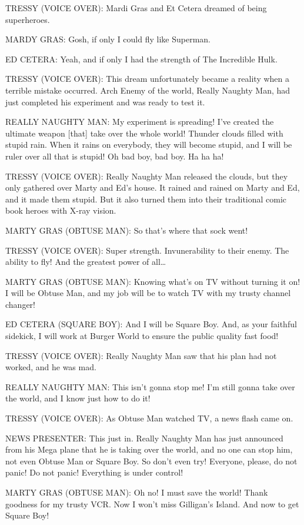 TRESSY (VOICE OVER):
Mardi Gras and Et Cetera dreamed of being superheroes.

MARDY GRAS:
Gosh, if only I could fly like Superman.

ED CETERA:
Yeah, and if only I had the strength of The Incredible Hulk.

TRESSY (VOICE OVER):
This dream unfortunately became a reality when a terrible mistake occurred.
Arch Enemy of the world, Really Naughty Man, had just completed his experiment and was ready to test it.

REALLY NAUGHTY MAN:
My experiment is spreading!
I've created the ultimate weapon [that] take over the whole world!
Thunder clouds filled with stupid rain.
When it rains on everybody, they will become stupid, and I will be ruler over all that is stupid!
Oh bad boy, bad boy.
Ha ha ha!

TRESSY (VOICE OVER):
Really Naughty Man released the clouds, but they only gathered over Marty and Ed's house.
It rained and rained on Marty and Ed, and it made them stupid.
But it also turned them into their traditional comic book heroes with X-ray vision.

MARTY GRAS (OBTUSE MAN):
So that's where that sock went!

TRESSY (VOICE OVER):
Super strength.
Invunerability to their enemy.
The ability to fly!
And the greatest power of all\dots

MARTY GRAS (OBTUSE MAN):
Knowing what's on TV without turning it on!
I will be Obtuse Man, and my job will be to watch TV with my trusty channel changer!

ED CETERA (SQUARE BOY):
And I will be Square Boy.
And, as your faithful sidekick, I will work at Burger World to ensure the public quality fast food!

TRESSY (VOICE OVER):
Really Naughty Man saw that his plan had not worked, and he was mad.

REALLY NAUGHTY MAN:
This isn't gonna stop me!
I'm still gonna take over the world, and I know just how to do it!

TRESSY (VOICE OVER):
As Obtuse Man watched TV, a news flash came on.

NEWS PRESENTER:
This just in.
Really Naughty Man has just announced from his Mega plane that he is taking over the world, and no one can stop him, not even Obtuse Man or Square Boy.
So don't even try!
Everyone, please, do not panic!
Do not panic!
Everything is under control!

MARTY GRAS (OBTUSE MAN):
Oh no!
I must save the world!
Thank goodness for my trusty VCR.
Now I won't miss Gilligan's Island.
And now to get Square Boy!

